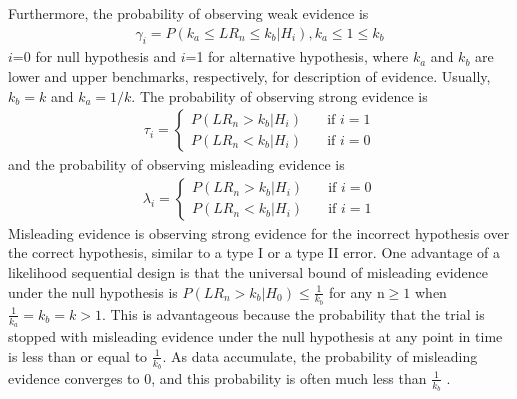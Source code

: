 \documentclass[12pt]{report}\usepackage[]{graphicx}\usepackage[]{color}
\newlength{\li}\setlength{\li}{14.48pt}
\newlength{\di}\setlength{\di}{-3.5mm}
\begin{document}
Furthermore, the probability of observing weak evidence is 
\begin{equation}
\begin{aligned}
\gamma_i = P(k_a \leq LR_n \leq k_b | H_i), k_a \leq 1 \leq k_b
\end{aligned}
\end{equation}
$i$=0 for null hypothesis and $i$=1 for alternative hypothesis, where $k_a$ and $k_b$ are lower and upper benchmarks, respectively, for description of evidence. Usually, $k_b = k$ and $k_a = 1/k$. The probability of observing strong evidence is 
\begin{equation}
\begin{aligned}
\tau_i = \left\{
        \begin{array}{ll}
            P(LR_n > k_b|H_i) & \quad \text{if } i = 1 \\
            P(LR_n < k_b|H_i) & \quad \text{if } i = 0
        \end{array}
    \right.
\end{aligned}
\end{equation}
and the probability of observing misleading evidence is 
\begin{equation}
\begin{aligned}
\lambda_i = \left\{
        \begin{array}{ll}
            P(LR_n > k_b|H_i) & \quad \text{if } i = 0 \\
            P(LR_n < k_b|H_i) & \quad \text{if } i = 1
        \end{array}
    \right.
\end{aligned}
\end{equation}
Misleading evidence is observing strong evidence for the incorrect hypothesis over the correct hypothesis, similar to a type I or a type II error. One advantage of a likelihood sequential design is that the universal bound of misleading evidence under the null hypothesis is $P(LR_n > k_b|H_0) \leq \frac{1}{k_b}$ for any $\mbox{n} \geq 1$ when $\frac{1}{k_a} = k_b = k > 1$. This is advantageous because the probability that the trial is stopped with misleading evidence under the null hypothesis at any point in time is less than or equal to $\frac{1}{k_b}$. As data accumulate, the probability of misleading evidence converges to 0, and this probability is often much less than $\frac{1}{k_b}$ \cite{BlumeNotes} \cite{Blume08}. \\
\end{document}
